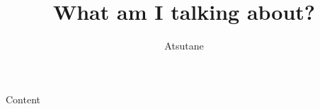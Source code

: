 \documentclass[mode=print,paper=screen,size=10pt,style=paintings]{powerdot}
\author{Atsutane}
\title{What am I talking about?}
\begin{document}
\maketitle
\begin{slide}{Content}
  \tableofcontents[content=sections]
\end{slide}
\end{document}
